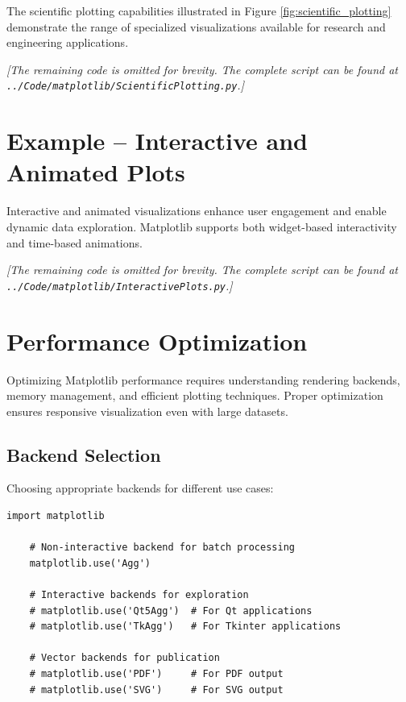 The scientific plotting capabilities illustrated in Figure \ref{fig:scientific_plotting} demonstrate the range of specialized visualizations available for research and engineering applications.



\noindent\textit{[The remaining code is omitted for brevity. The complete script can be found at \texttt{../Code/matplotlib/ScientificPlotting.py}.]}

\section{Example -- Interactive and Animated Plots}
\label{sec:interactive_example}

Interactive and animated visualizations enhance user engagement and enable dynamic data exploration. Matplotlib supports both widget-based interactivity and time-based animations.



\noindent\textit{[The remaining code is omitted for brevity. The complete script can be found at \texttt{../Code/matplotlib/InteractivePlots.py}.]}

\section{Performance Optimization}
\label{sec:matplotlib_optimization}

Optimizing Matplotlib performance requires understanding rendering backends, memory management, and efficient plotting techniques. Proper optimization ensures responsive visualization even with large datasets.

\subsection{Backend Selection}
\label{subsec:backend_selection}

Choosing appropriate backends for different use cases:

\begin{lstlisting}[language=MyPython, caption={Backend Optimization}, label={lst:backend_optimization}]
	import matplotlib
	
	# Non-interactive backend for batch processing
	matplotlib.use('Agg')
	
	# Interactive backends for exploration
	# matplotlib.use('Qt5Agg')  # For Qt applications
	# matplotlib.use('TkAgg')   # For Tkinter applications
	
	# Vector backends for publication
	# matplotlib.use('PDF')     # For PDF output
	# matplotlib.use('SVG')     # For SVG output
\end{lstlisting}

